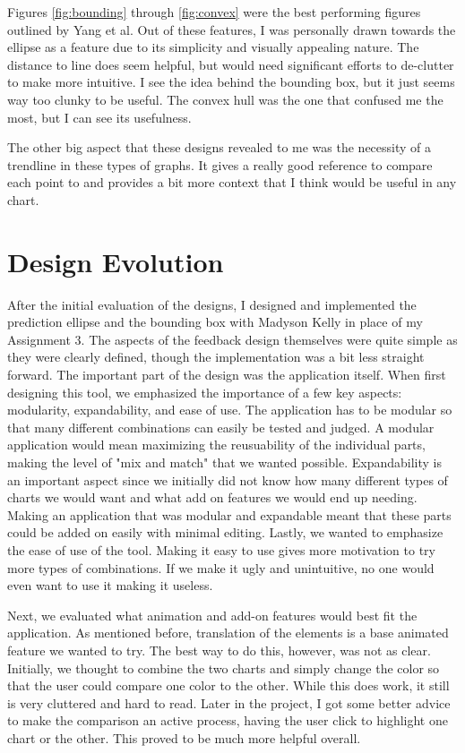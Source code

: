 \documentclass{proc}
\begin{document}
		Figures \ref{fig:bounding} through \ref{fig:convex} were the best performing figures outlined by Yang et al. Out of these features, I was personally drawn towards the ellipse as a feature due to its simplicity and visually appealing nature. The distance to line does seem helpful, but would need significant efforts to de-clutter to make more intuitive. I see the idea behind the bounding box, but it just seems way too clunky to be useful. The convex hull was the one that confused me the most, but I can see its usefulness. 
		
		The other big aspect that these designs revealed to me was the necessity of a trendline in these types of graphs. It gives a really good reference to compare each point to and provides a bit more context that I think would be useful in any chart. 
	
	\section{Design Evolution}
		After the initial evaluation of the designs, I designed and implemented the prediction ellipse and the bounding box with Madyson Kelly in place of my Assignment 3. The aspects of the feedback design themselves were quite simple as they were clearly defined, though the implementation was a bit less straight forward. The important part of the design was the application itself. When first designing this tool, we emphasized the importance of a few key aspects: modularity, expandability, and ease of use. The application has to be modular so that many different combinations can easily be tested and judged. A modular application would mean maximizing the reusuability of the individual parts, making the level of "mix and match" that we wanted possible. Expandability is an important aspect since we initially did not know how many different types of charts we would want and what add on features we would end up needing. Making an application that was modular and expandable meant that these parts could be added on easily with minimal editing. Lastly, we wanted to emphasize the ease of use of the tool. Making it easy to use gives more motivation to try more types of combinations. If we make it ugly and unintuitive, no one would even want to use it making it useless. 
	
		Next, we evaluated what animation and add-on features would best fit the application. As mentioned before, translation of the elements is a base animated feature we wanted to try. The best way to do this, however, was not as clear. Initially, we thought to combine the two charts and simply change the color so that the user could compare one color to the other. While this does work, it still is very cluttered and hard to read. Later in the project, I got some better advice to make the comparison an active process, having the user click to highlight one chart or the other. This proved to be much more helpful overall. 
		
\end{document}
